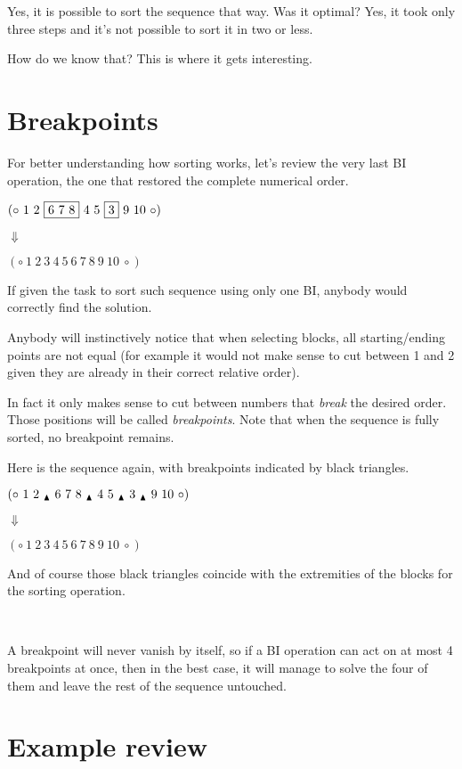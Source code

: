 \documentclass[11pt,final,twoside,nofrench]{thlifl}
\newcommand{\breakpoint}{ \textsubscript{$\textcolor{black}{\blacktriangle}$} }
\begin{document}
Yes, it is possible to sort the sequence that way. Was it optimal? Yes, it took only three steps and it's not possible to sort it in two or less.

How do we know that? This is where it gets interesting.

\section{Breakpoints}

For better understanding how sorting works, let's review the very last BI operation, the one that restored the complete numerical order.

\begin{center}
$(\circ~1~2~\fbox{6~7~8}~4~5~\fbox{3}~9~10~\circ)$

$\Downarrow$

$(\circ~1~2~3~4~5~6~7~8~9~10~\circ)$
\end{center}

If given the task to sort such sequence using only one BI, anybody would correctly find the solution.

Anybody will instinctively notice that when selecting blocks, all starting/ending points are not equal (for example it would not make sense to cut between 1 and 2 given they are already in their correct relative order).

In fact it only makes sense to cut between numbers that \emph{break} the desired order. Those positions will be called \emph{breakpoints}. Note that when the sequence is fully sorted, no breakpoint remains.

Here is the sequence again, with breakpoints indicated by black triangles.

\begin{center}
$(\circ~1~2~\breakpoint~6~7~8~\breakpoint~4~5~\breakpoint~3~\breakpoint~9~10~\circ)$

$\Downarrow$

$(\circ~1~2~3~4~5~6~7~8~9~10~\circ)$
\end{center}

And of course those black triangles coincide with the extremities of the blocks for the sorting operation.

~

A breakpoint will never vanish by itself, so if a BI operation can act on at most 4 breakpoints at once, then in the best case, it will manage to solve the four of them and leave the rest of the sequence untouched.

\section{Example review}
\end{document}

